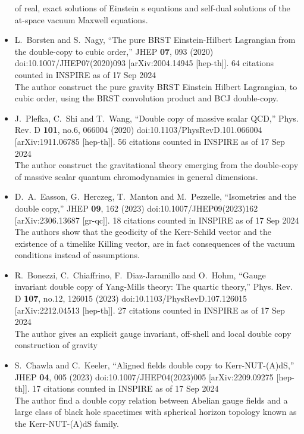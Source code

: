 \documentclass[a4paper,12pt]{article}
\begin{document}
\begin{itemize}
    of real, exact solutions of Einstein s equations and self-dual solutions of the at-space vacuum Maxwell equations.
    \item %
    L.~Borsten and S.~Nagy,
    ``The pure BRST Einstein-Hilbert Lagrangian from the double-copy to cubic order,''
    JHEP \textbf{07}, 093 (2020)
    doi:10.1007/JHEP07(2020)093
    [arXiv:2004.14945 [hep-th]].
    64 citations counted in INSPIRE as of 17 Sep 2024\\
    The author construct the pure gravity BRST Einstein Hilbert Lagrangian, to cubic order, using the BRST convolution product and BCJ double-copy.
    \item  %
    J.~Plefka, C.~Shi and T.~Wang,
    ``Double copy of massive scalar QCD,''
    Phys. Rev. D \textbf{101}, no.6, 066004 (2020)
    doi:10.1103/PhysRevD.101.066004
    [arXiv:1911.06785 [hep-th]].
    56 citations counted in INSPIRE as of 17 Sep 2024\\
    The author construct the gravitational theory emerging from the double-copy of massive scalar quantum
    chromodynamics in general dimensions. 
    \item  %
    D.~A.~Easson, G.~Herczeg, T.~Manton and M.~Pezzelle,
    ``Isometries and the double copy,''
    JHEP \textbf{09}, 162 (2023)
    doi:10.1007/JHEP09(2023)162
    [arXiv:2306.13687 [gr-qc]].
    18 citations counted in INSPIRE as of 17 Sep 2024\\
    The authors show that the geodicity of the Kerr-Schild vector and the existence of a timelike Killing vector, are in fact consequences of the vacuum conditions instead of assumptions.
    \item %
    R.~Bonezzi, C.~Chiaffrino, F.~Diaz-Jaramillo and O.~Hohm,
    ``Gauge invariant double copy of Yang-Mills theory: The quartic theory,''
    Phys. Rev. D \textbf{107}, no.12, 126015 (2023)
    doi:10.1103/PhysRevD.107.126015
    [arXiv:2212.04513 [hep-th]].
    27 citations counted in INSPIRE as of 17 Sep 2024\\
    The author gives an explicit gauge invariant, off-shell and local double copy construction of
    gravity
    \item %
    S.~Chawla and C.~Keeler,
    ``Aligned fields double copy to Kerr-NUT-(A)dS,''
    JHEP \textbf{04}, 005 (2023)
    doi:10.1007/JHEP04(2023)005
    [arXiv:2209.09275 [hep-th]].
    17 citations counted in INSPIRE as of 17 Sep 2024\\
    The author find a double copy relation between Abelian gauge fields and a large class of black
 hole spacetimes with spherical horizon topology known as the Kerr-NUT-(A)dS family.
\end{itemize}
\end{document}
